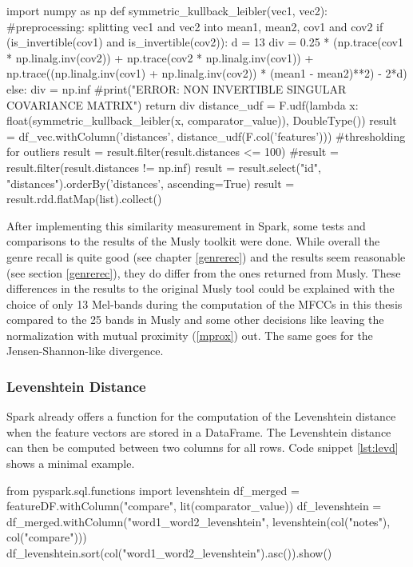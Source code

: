 \begin{pythonCode}[frame=single,label={lst:kl},caption={Kullback-Leibler Divergence},captionpos=b]
import numpy as np
def symmetric_kullback_leibler(vec1, vec2):
	#preprocessing: splitting vec1 and vec2 into mean1, mean2, cov1 and cov2
	if (is_invertible(cov1) and is_invertible(cov2)):
		d = 13
		div = 0.25 * (np.trace(cov1 * np.linalg.inv(cov2)) + 
			np.trace(cov2 * np.linalg.inv(cov1)) + 
			np.trace((np.linalg.inv(cov1) + 
			np.linalg.inv(cov2)) * (mean1 - mean2)**2) - 2*d)
	else: 
		div = np.inf
		#print("ERROR: NON INVERTIBLE SINGULAR COVARIANCE MATRIX\n")  
	return div
distance_udf = F.udf(lambda x: float(symmetric_kullback_leibler(x, comparator_value)), DoubleType())
result = df_vec.withColumn('distances', distance_udf(F.col('features')))
#thresholding for outliers
result = result.filter(result.distances <= 100)  
#result = result.filter(result.distances != np.inf)        
result = result.select("id", "distances").orderBy('distances', ascending=True)
result = result.rdd.flatMap(list).collect()
\end{pythonCode}

\noindent After implementing this similarity measurement in Spark, some tests and comparisons to the results of the Musly toolkit \cite{musly1} were done. While overall the genre recall is quite good (see chapter \ref{genrerec}) and the results seem reasonable (see section \ref{genrerec}), they do differ from the ones returned from Musly. 
These differences in the results to the original Musly tool could be explained with the choice of only 13 Mel-bands during the computation of the MFCCs in this thesis compared to the 25 bands in Musly \cite{musly1} and some other decisions like leaving the normalization with mutual proximity (\ref{mprox}) out. The same goes for the Jensen-Shannon-like divergence. 


\subsubsection{Levenshtein Distance}

Spark already offers a function for the computation of the Levenshtein distance when the feature vectors are stored in a DataFrame. The Levenshtein distance can then be computed between two columns for all rows. Code snippet \ref{lst:levd} shows a minimal example. 

\begin{pythonCode}[frame=single,label={lst:levd},caption={Levenshtein DataFrame},captionpos=b]
from pyspark.sql.functions import levenshtein 
df_merged = featureDF.withColumn("compare", lit(comparator_value)) 
df_levenshtein = df_merged.withColumn("word1_word2_levenshtein", levenshtein(col("notes"), col("compare")))
df_levenshtein.sort(col("word1_word2_levenshtein").asc()).show()
\end{pythonCode}

